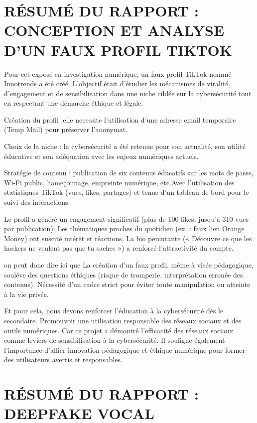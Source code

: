 \documentclass[12pt,a4paper]{article}
\begin{document}
		{\large 
		\section*{RÉSUMÉ DU RAPPORT : CONCEPTION ET ANALYSE D’UN FAUX PROFIL TIKTOK}
		Pour cet exposé en investigation numérique, un faux profil TikTok nommé Innotrends a été créé. L’objectif était d’étudier les mécanismes de viralité, d’engagement et de sensibilisation dans une niche ciblée sur la cybersécurité tout en respectant une démarche éthique et légale.
		
		Création du profil :elle necessite l'utilisation d’une adresse email temporaire (Temp Mail) pour préserver l’anonymat.
		
		Choix de la niche : la cybersécurité a été retenue pour son actualité, son utilité éducative et son adéquation avec les enjeux numériques actuels.
		
		Stratégie de contenu : publication de six contenus éducatifs sur les mots de passe, Wi-Fi public, hameçonnage, empreinte numérique, etc.Avec l'utilisation des statistiques TikTok (vues, likes, partages) et tenue d’un tableau de bord pour le suivi des interactions.
		
		Le profil a généré un engagement significatif (plus de 100 likes, jusqu’à 310 vues par publication). Les thématiques proches du quotidien (ex. : faux lien Orange Money) ont suscité intérêt et réactions. La bio percutante (« Découvre ce que les hackers ne veulent pas que tu saches ») a renforcé l’attractivité du compte.
		
		on peut donc dire ici que La création d’un faux profil, même à visée pédagogique, soulève des questions éthiques (risque de tromperie, interprétation erronée des contenus). Nécessité d’un cadre strict pour éviter toute manipulation ou atteinte à la vie privée.
		
		Et pour cela, nous devons renforcer l’éducation à la cybersécurité dès le secondaire. Promouvoir une utilisation responsable des réseaux sociaux et des outils numériques. Car ce projet a démontré l’efficacité des réseaux sociaux comme leviers de sensibilisation à la cybersécurité. Il souligne également l’importance d’allier innovation pédagogique et éthique numérique pour former des utilisateurs avertis et responsables.\\[1.5 cm]
		
		\section*{RÉSUMÉ DU RAPPORT : DEEPFAKE VOCAL}
		
}
\end{document}
